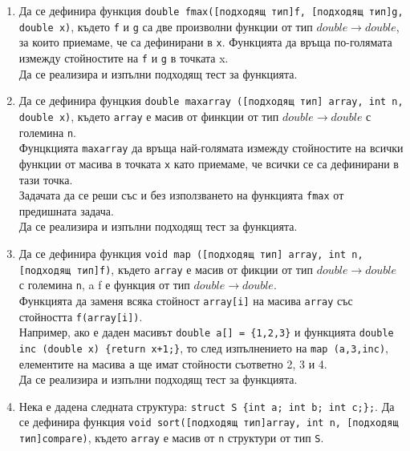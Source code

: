 \documentclass[12pt,a4paper]{article}
\begin{document}
\begin{enumerate}
	\item Да се дефинира функция \texttt{double fmax([подходящ тип]f, [подходящ тип]g, double x)}, където \texttt{f} и \texttt{g} са две произволни функции от тип $double \rightarrow double$, за които приемаме, че са дефинирани в \texttt{x}.  Функцията да връща по-голямата измежду стойностите на \texttt{f} и \texttt{g} в точката x.\\

	Да се реализира и изпълни подходящ тест за функцията.

	\item Да се дефинира фунцкия \texttt{double maxarray ([подходящ тип] array, int n, double x)}, където \texttt{array} е масив от финкции от тип $double \rightarrow double$ с големина \texttt{n}. \\

	Фунцкцията \texttt{maxarray} да връща най-голямата измежду стойностите на всички функции от масива в точката \texttt{x} като приемаме, че всички се са дефинирани в тази точка.\\

	Задачата да се реши със и без използването на функцията \texttt{fmax} от предишната задача.\\

	Да се реализира и изпълни подходящ тест за функцията.

	\item Да се дефинира функция \texttt{void map ([подходящ тип] array, int n, [подходящ тип]f)}, където \texttt{array} е масив от фикции от тип $double \rightarrow double$ с големина \texttt{n}, a f е функция от тип $double \rightarrow double$.\\

	Функцията да заменя всяка стойност \texttt{array[i]} на масива \texttt{array} със стойността \texttt{f(array[i])}.\\

	Например, ако е даден масивът \texttt{double a[] = \{1,2,3\}} и функцията \texttt {double inc (double x) \{return x+1;\}}, то след изпълнението на \texttt{map (a,3,inc)}, елементите на масива \texttt{a} ще имат стойности съответно 2, 3 и 4.\\

	Да се реализира и изпълни подходящ тест за функцията.

	\item Нека е дадена следната структура: \texttt{struct S \{int a; int b; int c;\};}. Да се дефинира функция \texttt{void sort([подходящ тип]array, int n, [подходящ тип]compare)}, където \texttt{array} е масив от \texttt{n} структури от тип \texttt{S}.\\


\end{enumerate}
\end{document}
